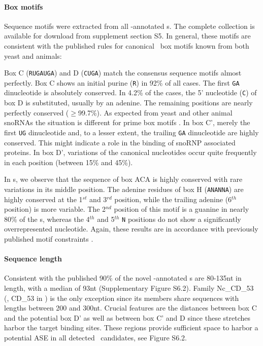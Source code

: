 \paragraph{\textbf{Box motifs}} Sequence motifs were extracted from all
\snostrip-annotated \sno s. The complete collection is available for
download from supplement section S5. In general, these motifs are
consistent with the published rules \cite{Xia:1997, Watkins:2000,
  Cahill:2002, Watkins:2002} for canonical \sno\ box motifs known from both
yeast and animals:

Box C (\texttt{RUGAUGA}) and D (\texttt{CUGA}) match the consensus sequence
motifs almost perfectly. Box C shows an initial purine (\texttt{R}) in 92\%
of all cases.  The first \texttt{GA} dinucleotide is absolutely conserved.
In 4.2\% of the cases, the 5' nucleotide (\texttt{C}) of box D is
substituted, usually by an adenine. The remaining positions are nearly
perfectly conserved ($\ge$99.7\%). As expected from yeast and other animal
snoRNAs the situation is different for prime box motifs
\cite{Cahill:2002,Kiss-László:1998}.  In box C', merely the first
\texttt{UG} dinucleotide and, to a lesser extent, the trailing \texttt{GA}
dinucleotide are highly conserved.  This might indicate a role in the
binding of snoRNP associated proteins.  In box D', variations of the
canonical nucleotides occur quite frequently in each position (between 15\%
and 45\%).

In \haca s, we observe that the sequence of box ACA is highly
conserved with rare variations in its middle position. The adenine
residues of box H (\texttt{ANANNA}) are highly conserved at the
1$^{st}$ and 3$^{rd}$ position, while the trailing adenine (6$^{th}$
position) is more variable. The 2$^{nd}$ position of this motif is a
guanine in nearly 80\% of the \haca s, whereas the 4$^{th}$ and
5$^{th}$ \texttt{N} positions do not show a significantly
overrepresented nucleotide. Again, these results are in accordance
with previously published motif constraints \cite{Normand:2006}.

\paragraph{\textbf{Sequence length}} Consistent with the published
 90\% of the novel \snostrip-annotated \sno s are
80-135nt in length, with a median of 93nt (Supplementary Figure S6.2).
Family Nc\_CD\_53 (\ncr, CD\_53 in \snostrip) is the only exception since
its members share sequences with lengths between 200 and 300nt.  Crucial
features are the distances between box C and the potential box D' as well
as between box C' and D since these stretches harbor the target binding
sites. These regions provide sufficient space to harbor a potential ASE in
all detected \sno\ candidates, see Figure S6.2.


